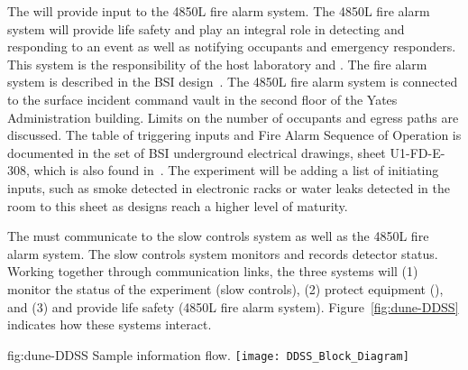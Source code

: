 The  will provide input to the 4850L
fire alarm system.  The 4850L fire alarm system will provide life
safety and play an integral role in detecting and responding to an
event as well as notifying occupants and emergency responders.  This
system is the responsibility of the host laboratory and .  The
fire alarm system is described in the BSI design~\cite{bib:cernedms2093229}.  %
The 4850L fire alarm system is connected to the surface incident command vault in the
second floor of the Yates Administration building. Limits on the
number of occupants and egress paths are discussed. The table of
triggering inputs and Fire Alarm Sequence of Operation is documented
in the set of BSI underground electrical drawings, sheet U1-FD-E-308,
which is also found in~\cite{bib:cernedms2093229}. %
The
experiment will be adding a list of initiating inputs, such as smoke
detected in electronic racks or water leaks detected in the
 room to this sheet as designs reach a higher level of
maturity.  %

 
The  must communicate to the  slow controls
system as well as the 4850L fire alarm system.  The  slow
controls system monitors and records detector
status.  Working together through communication links, the three
systems will (1) monitor the status of the experiment (slow controls),
(2) protect equipment (),  and (3) and provide life safety (4850L fire alarm system). Figure~\ref{fig:dune-DDSS} indicates how these systems
interact. %
\begin{dunefigure}{fig:dune-DDSS}
  {Sample  information flow.}
  \texttt{[image: DDSS\_Block\_Diagram]}
\end{dunefigure}


